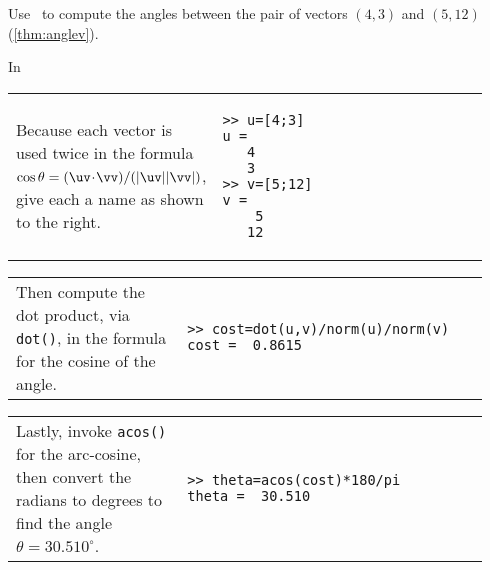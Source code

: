 \begin{example} \label{eg:}
Use \script\ to compute the angles between the pair of vectors \((4,3)\) and \((5,12)\) (\autoref{thm:anglev}).
\begin{solution} In \script

\begin{tabular}{@{}p{0.34\linewidth}p{0.6\linewidth}@{}}\raggedright
Because each vector is used twice in the formula \(\cos\theta=(\uv\cdot\vv)/(|\uv||\vv|)\), give each a name as shown to the right.
&\begin{verbatim}
>> u=[4;3]
u =
   4
   3
>> v=[5;12]
v =
    5
   12
\end{verbatim}
\end{tabular}
\setbox\ajrqrbox\hbox{}%
\marginpar{\usebox{\ajrqrbox\\[2ex]}}%

\begin{tabular}{@{}p{0.34\linewidth}p{0.6\linewidth}@{}}\raggedright
Then compute the dot product, via \verb|dot()|, in the formula for the cosine of the angle.
&\begin{verbatim}
>> cost=dot(u,v)/norm(u)/norm(v)
cost =  0.8615
\end{verbatim}
\end{tabular}

\begin{tabular}{@{}p{0.34\linewidth}p{0.6\linewidth}@{}}\raggedright
Lastly, invoke \verb|acos()| for the arc-cosine, then convert the radians to degrees to find the angle \(\theta=30.510^\circ\).
&\begin{verbatim}
>> theta=acos(cost)*180/pi
theta =  30.510
\end{verbatim}
\end{tabular}

\end{solution}
\end{example}




